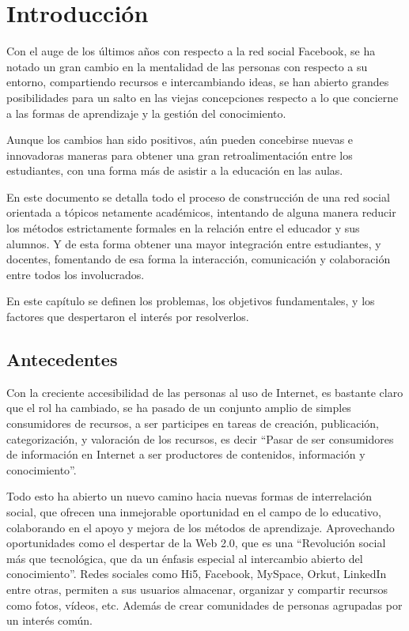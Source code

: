 \chapter{Introducción}

Con el auge de los últimos años con respecto a la red social
Facebook\cite{Jeria}, se ha notado un gran cambio en la mentalidad de las
personas con respecto a su entorno, compartiendo recursos e intercambiando
ideas, se han abierto grandes posibilidades para un salto en las viejas
concepciones respecto a lo que concierne a las formas de aprendizaje y la
gestión del conocimiento.

Aunque los cambios han sido positivos, aún pueden concebirse nuevas e
innovadoras maneras para obtener una gran retroalimentación entre los
estudiantes, con una forma más de asistir a la educación en las aulas.

En este documento se detalla todo el proceso de construcción de una red social
orientada a tópicos netamente académicos, intentando de alguna manera reducir
los métodos estrictamente formales en la relación entre el educador y sus
alumnos. Y de esta forma obtener una mayor integración entre estudiantes, y
docentes, fomentando de esa forma la interacción, comunicación y colaboración
entre todos los involucrados.

En este capítulo se definen los problemas, los objetivos fundamentales, y los
factores que despertaron el interés por resolverlos.

\section{Antecedentes}
Con la creciente accesibilidad de las personas al uso de Internet, es bastante
claro que el rol ha cambiado, se ha pasado de un conjunto amplio de simples
consumidores de recursos, a ser participes en tareas de creación, publicación,
categorización, y valoración de los recursos, es decir “Pasar de ser
consumidores de información en Internet a ser productores de contenidos,
información y conocimiento”\cite{Rodriguez}.

Todo esto ha abierto un nuevo camino hacia nuevas formas de interrelación
social, que ofrecen una inmejorable oportunidad en el campo de lo educativo,
colaborando en el apoyo y mejora de los métodos de aprendizaje. Aprovechando
oportunidades como el despertar de la Web 2.0, que es una “Revolución social
más que tecnológica, que da un énfasis especial al intercambio abierto del
conocimiento”\cite{Rodriguez}. Redes sociales como Hi5, Facebook, MySpace,
Orkut, LinkedIn entre otras, permiten a sus usuarios almacenar, organizar y
compartir recursos como fotos, vídeos, etc. Además de crear comunidades de
personas agrupadas por un interés común.


